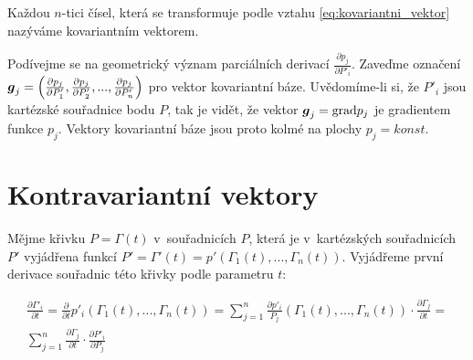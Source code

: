 Každou \(n\)-tici čísel, která se transformuje podle vztahu \eqref{eq:kovariantni_vektor} nazýváme kovariantním vektorem.

Podívejme se na geometrický význam parciálních derivací \(\frac{\partial p_j}{\partial P'_i}\). Zaveďme označení \(\boldsymbol{g}_j = \left(\frac{\partial p_j}{\partial P'_1}, \frac{\partial p_j}{\partial P'_2}, ..., \frac{\partial p_j}{\partial P'_n}\right)\) pro vektor kovariantní báze. Uvědomíme-li si, že \(P'_i\) jsou kartézské souřadnice bodu \(P\), tak je vidět, že vektor \(\boldsymbol{g}_j = \mathrm{grad} p_j\) je gradientem funkce \(p_j\). Vektory kovariantní báze jsou proto kolmé na plochy \(p_j = konst\).

 

\section{Kontravariantní vektory}

Mějme křivku \(P = \Gamma(t)\) v~souřadnicích \(P\), která je v~kartézských souřadnicích \(P'\) vyjádřena funkcí \(P' = \Gamma'(t) = p'(\Gamma_1(t), ..., \Gamma_n(t))\). Vyjádřeme první derivace souřadnic této křivky podle parametru \(t\):

\begin{equation}
\begin{split}
\frac{\partial \Gamma'_i}{\partial t} = \frac{\partial}{\partial t} p'_i(\Gamma_1(t), ..., \Gamma_n(t)) = \sum_{j=1}^n \frac{\partial p'_i}{P_j} (\Gamma_1(t), ..., \Gamma_n(t)) \cdot \frac{\partial \Gamma_j}{\partial t} = \\
\sum_{j=1}^n \frac{\partial \Gamma_j}{\partial t} \cdot \frac{\partial P'_i}{\partial P_j}
\end{split}
\end{equation}

